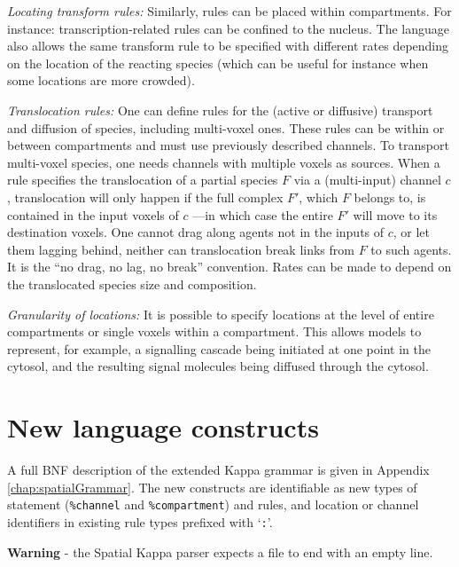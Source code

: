 \documentclass[english]{report}
\begin{document}
\medskip\emph{Locating transform rules:} Similarly, rules can be placed within compartments. For instance: transcription-related rules can be confined to the nucleus. The language also allows the same transform rule to be specified with different rates depending on the location of the reacting species (which can be useful for instance when some locations are more crowded).

\medskip\emph{Translocation rules:} One can define rules for the (active or diffusive) transport and diffusion of species, including multi-voxel ones. These rules can be within or between compartments and must use previously described channels. To transport multi-voxel species, one needs channels with multiple voxels as sources. When a rule specifies the translocation of a partial species $F$ via a (multi-input) channel $c$, translocation will only happen if the full complex $F'$, which $F$ belongs to, is contained in the input voxels of $c$ ---in which case the entire $F'$ will move to its destination voxels. One cannot drag along agents not in the inputs of $c$, or let them lagging behind, neither can translocation break links from $F$ to such agents. It is the ``no drag, no lag, no break'' convention. Rates can be made to depend on the translocated species size and composition.

%
\medskip\emph{Granularity of locations:} It is possible to specify locations at the level of entire compartments or single voxels within a compartment. This allows models to represent, for example, a signalling cascade being initiated at one point in the cytosol, and the resulting signal molecules being diffused through the cytosol. 





\section{New language constructs}

A full BNF description of the extended Kappa grammar is given in Appendix \ref{chap:spatialGrammar}. The new constructs are identifiable as new types of statement (\verb|%channel| and \verb|%compartment|) and rules, and location or channel identifiers in existing rule types prefixed with `\verb|:|'.

\textbf{Warning} - the Spatial Kappa parser expects a file to end with an empty line.
\end{document}
